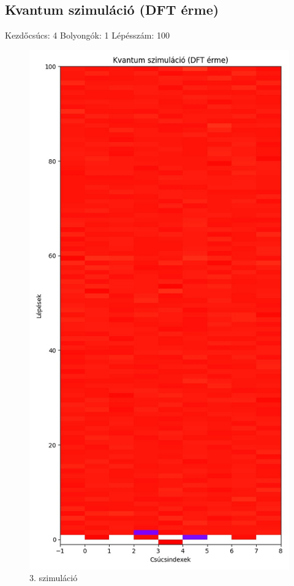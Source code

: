 \documentclass[14pt,a4paper]{article}
\begin{document}
\subsection{Kvantum szimuláció (DFT érme)}
Kezdőcsúcs: 4
Bolyongók: 1
Lépésszám: 100
\begin{figure}[H]
\centering
\includegraphics[width = 0.7\columnwidth]{sim_03/counts.jpg}
\caption{3. szimuláció}
\end{figure}
\end{document}
